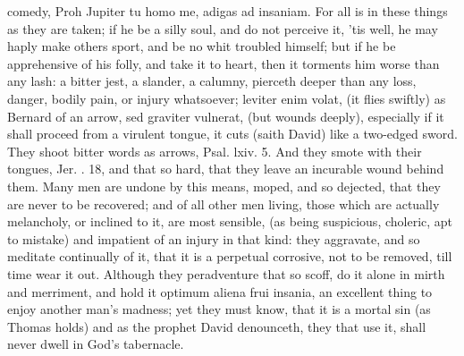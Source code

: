{comedy, Proh Jupiter tu homo me, adigas ad insaniam. For all is in
these things as they are taken; if he be a silly soul, and do not
perceive it, 'tis well, he may haply make others sport, and be no whit
troubled himself; but if he be apprehensive of his folly, and take it
to heart, then it torments him worse than any lash: a bitter jest, a
slander, a calumny, pierceth deeper than any loss, danger, bodily pain,
or injury whatsoever; leviter enim volat, (it flies swiftly) as Bernard
of an arrow, sed graviter vulnerat, (but wounds deeply), especially if
it shall proceed from a virulent tongue, it cuts (saith David) like a
two-edged sword. They shoot bitter words as arrows, Psal. lxiv. 5. And
they smote with their tongues, Jer. . 18, and that so hard, that
they leave an incurable wound behind them. Many men are undone by this
means, moped, and so dejected, that they are never to be recovered; and
of all other men living, those which are actually melancholy, or
inclined to it, are most sensible, (as being suspicious, choleric, apt
to mistake) and impatient of an injury in that kind: they aggravate,
and so meditate continually of it, that it is a perpetual corrosive,
not to be removed, till time wear it out. Although they peradventure
that so scoff, do it alone in mirth and merriment, and hold it optimum
aliena frui insania, an excellent thing to enjoy another man's madness;
yet they must know, that it is a mortal sin (as Thomas holds) and
as the prophet David denounceth, they that use it, shall never
dwell in God's tabernacle.

}

